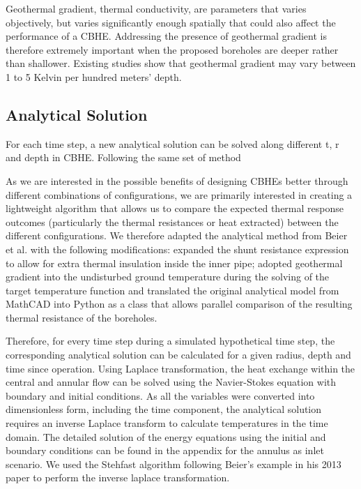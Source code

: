 	Geothermal gradient, thermal conductivity, are parameters that varies objectively, but varies significantly enough spatially that could also affect the performance of a CBHE. Addressing the presence of geothermal gradient is therefore extremely important when the proposed boreholes are deeper rather than shallower. Existing studies show that geothermal gradient may vary between 1 to 5 Kelvin per hundred meters' depth\cite{holmberg_thermal_2016,shrestha_assessment_2018}.

	
		
\subsection{Analytical Solution}
	For each time step, a new analytical solution can be solved along different t, r and depth in CBHE. Following the same set of method 
	

	
	As we are interested in the possible benefits of designing CBHEs better through different combinations of configurations, we are primarily interested in creating a lightweight algorithm that allows us to compare the expected thermal response outcomes (particularly the thermal resistances or heat extracted) between the different configurations. We therefore adapted the analytical method from Beier et al. \cite{beier_borehole_2013} with the following modifications: expanded the shunt resistance expression to allow for extra thermal insulation inside the inner pipe; adopted geothermal gradient into the undisturbed ground temperature during the solving of the target temperature function and translated the original analytical model from MathCAD into Python as a class that allows parallel comparison of the resulting thermal resistance of the boreholes.

	Therefore, for every time step during a simulated hypothetical time step, the corresponding analytical solution can be calculated for a given radius, depth and time since operation. Using Laplace transformation, the heat exchange within the central and annular flow can be solved using the Navier-Stokes equation with boundary and initial conditions. As all the variables were converted into dimensionless form, including the time component, the analytical solution requires an inverse Laplace transform to calculate temperatures in the time domain. The detailed solution of the energy equations using the initial and boundary conditions can be found in the appendix for the annulus as inlet scenario. We used the Stehfast algorithm following Beier's example in his 2013 paper\cite{beier2013} to perform the inverse laplace transformation. 

